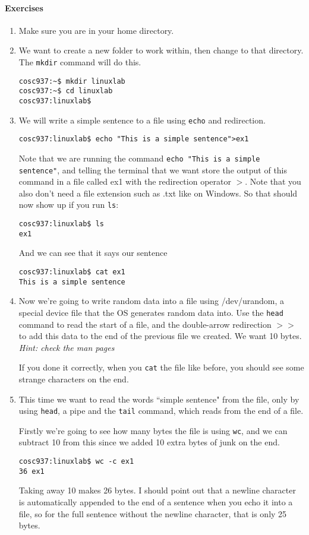 \documentclass{article}
\begin{document}
\paragraph{Exercises}
\begin{enumerate}
\item Make sure you are in your home directory.
\item We want to create a new folder to work within, then change to that directory. The \texttt{mkdir} command will do this.
\begin{verbatim}
cosc937:~$ mkdir linuxlab
cosc937:~$ cd linuxlab
cosc937:linuxlab$
\end{verbatim}
\item We will write a simple sentence to a file using \texttt{echo} and redirection.
\begin{verbatim}
cosc937:linuxlab$ echo "This is a simple sentence">ex1
\end{verbatim}
Note that we are running the command \texttt{echo "This is a simple sentence"}, and telling the terminal that we want store the output of this command in a file called ex1 with the redirection operator $>$. Note that you also don't need a file extension such as .txt like on Windows.
So that should now show up if you run \texttt{ls}:
\begin{verbatim}
cosc937:linuxlab$ ls
ex1
\end{verbatim}
And we can see that it says our sentence
\begin{verbatim}
cosc937:linuxlab$ cat ex1 
This is a simple sentence
\end{verbatim}
\item Now we're going to write random data into a file using /dev/urandom, a special device file that the OS generates random data into. Use the \texttt{head} command to read the start of a file, and the double-arrow redirection $>>$ to add this data to the end of the previous file we created. We want 10 bytes. \emph{Hint: check the man pages}

If you done it correctly, when you \texttt{cat} the file like before, you should see some strange characters on the end.
\item This time we want to read the words ``simple sentence" from the file, only by using \texttt{head}, a pipe and the \texttt{tail} command, which reads from the end of a file. 

Firstly we're going to see how many bytes the file is using \texttt{wc}, and we can subtract 10 from this since we added 10 extra bytes of junk on the end.
\begin{verbatim}
cosc937:linuxlab$ wc -c ex1 
36 ex1
\end{verbatim}
Taking away 10 makes 26 bytes. I should point out that a newline character is automatically appended to the end of a sentence when you echo it into a file, so for the full sentence without the newline character, that is only 25 bytes.


\end{enumerate}
\end{document}
